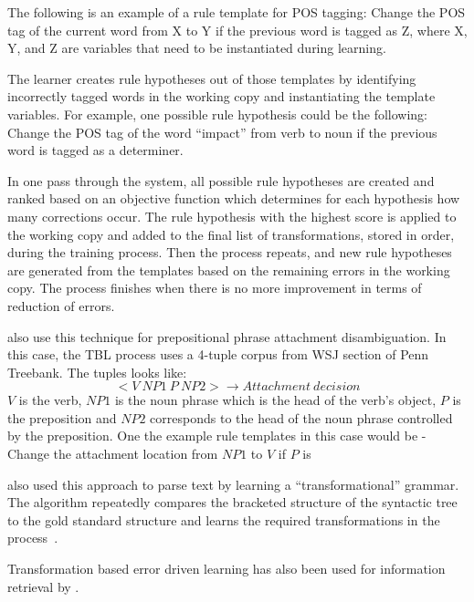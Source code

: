 The following is an example of a rule template for POS tagging: Change the POS tag of the current word from X to Y if the previous word is tagged as Z, where X, Y, and Z are variables that need to be instantiated during learning. 

The learner creates rule hypotheses out of those templates by identifying incorrectly tagged words in the working copy and instantiating the template variables.
For example, one possible rule hypothesis could be the following: Change the POS tag of the word ``impact'' from verb to noun if the previous word is tagged as a determiner. %

In one pass through the system, all possible rule hypotheses are created and ranked  based on an objective function which determines for each hypothesis how many corrections occur. The rule hypothesis with the highest score is applied to the working copy and added to the final list of transformations, stored in order, during the training process. Then the process repeats, and new rule hypotheses are generated from the templates based on the remaining errors in the working copy. The process finishes when there is no more improvement in terms of reduction of errors.~

\citet{brill1994rule} also use this technique for prepositional phrase attachment disambiguation. In this case, the TBL process uses a 4-tuple corpus from WSJ section of Penn Treebank. The tuples looks like: $$<V\ NP1\ P\ NP2> \rightarrow Attachment\ decision$$
$V$ is the verb, $NP1$ is the noun phrase which is the head of the verb's object, $P$ is the preposition and $NP2$ corresponds to the head of the noun phrase controlled by the preposition. One the example rule templates in this case would be - \\
Change the attachment location from $NP1$ to $V$ if $P$ is 


\citet{brill1993automatic} also used this approach to parse text by learning a ``transformational'' grammar. The algorithm repeatedly compares the bracketed structure of the syntactic tree to the gold standard structure and learns the required transformations in the process~. 



Transformation based error driven learning has also been used for information retrieval by \citet{woodley2005applying}.





